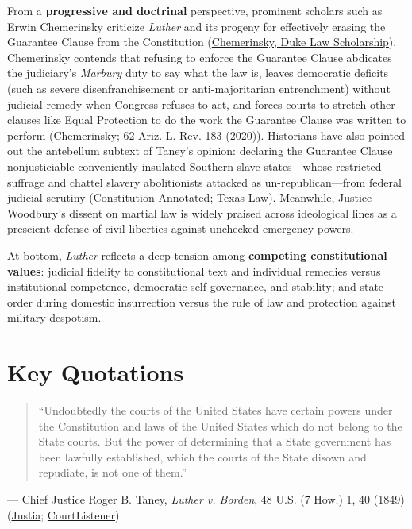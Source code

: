 \documentclass[12pt]{article}
\begin{document}
From a \textbf{progressive and doctrinal} perspective, prominent scholars such as Erwin Chemerinsky criticize \textit{Luther} and its progeny for effectively erasing the Guarantee Clause from the Constitution (\href{https://scholarship.law.duke.edu/cgi/viewcontent.cgi?article=1696&context=faculty_scholarship}{Chemerinsky, Duke Law Scholarship}). Chemerinsky contends that refusing to enforce the Guarantee Clause abdicates the judiciary's \textit{Marbury} duty to say what the law is, leaves democratic deficits (such as severe disenfranchisement or anti-majoritarian entrenchment) without judicial remedy when Congress refuses to act, and forces courts to stretch other clauses like Equal Protection to do the work the Guarantee Clause was written to perform (\href{https://scholarship.law.duke.edu/cgi/viewcontent.cgi?article=1696&context=faculty_scholarship}{Chemerinsky}; \href{https://arizonalawreview.org/pdf/62-1/62arizlrev183.pdf}{62 Ariz. L. Rev. 183 (2020)}). Historians have also pointed out the antebellum subtext of Taney's opinion: declaring the Guarantee Clause nonjusticiable conveniently insulated Southern slave states---whose restricted suffrage and chattel slavery abolitionists attacked as un-republican---from federal judicial scrutiny (\href{https://www.law.cornell.edu/constitution-conan/article-3/section-2/clause-1/luther-v-borden-and-the-guarantee-clause}{Constitution Annotated}; \href{https://law.utexas.edu/faculty/uploads/publication_files/luther-v.-borden--a-taney-court-mystery-solved.pdf}{Texas Law}). Meanwhile, Justice Woodbury's dissent on martial law is widely praised across ideological lines as a prescient defense of civil liberties against unchecked emergency powers.

At bottom, \textit{Luther} reflects a deep tension among \textbf{competing constitutional values}: judicial fidelity to constitutional text and individual remedies versus institutional competence, democratic self-governance, and stability; and state order during domestic insurrection versus the rule of law and protection against military despotism.

\section{Key Quotations}

\begin{quote}
``Undoubtedly the courts of the United States have certain powers under the Constitution and laws of the United States which do not belong to the State courts. But the power of determining that a State government has been lawfully established, which the courts of the State disown and repudiate, is not one of them.''
\end{quote}
\noindent --- Chief Justice Roger B. Taney, \textit{Luther v. Borden}, 48 U.S. (7 How.) 1, 40 (1849) (\href{https://supreme.justia.com/cases/federal/us/48/1/}{Justia}; \href{https://www.courtlistener.com/opinion/86466/luther-v-borden/}{CourtListener}).
\end{document}
